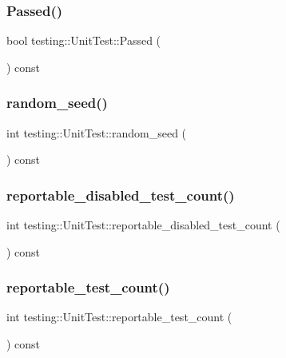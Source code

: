 \subsubsection{\texorpdfstring{Passed()}{Passed()}}
{\footnotesize\ttfamily bool testing\+::\+Unit\+Test\+::\+Passed (\begin{DoxyParamCaption}{ }\end{DoxyParamCaption}) const}

\mbox{\label{classtesting_1_1UnitTest_adddc090a06f2d3a0e68f3762ee262688}} 
\subsubsection{\texorpdfstring{random\_seed()}{random\_seed()}}
{\footnotesize\ttfamily int testing\+::\+Unit\+Test\+::random\+\_\+seed (\begin{DoxyParamCaption}{ }\end{DoxyParamCaption}) const}

\mbox{\label{classtesting_1_1UnitTest_a2a2835db178d5c8569507db9f0a3d54f}} 
\subsubsection{\texorpdfstring{reportable\_disabled\_test\_count()}{reportable\_disabled\_test\_count()}}
{\footnotesize\ttfamily int testing\+::\+Unit\+Test\+::reportable\+\_\+disabled\+\_\+test\+\_\+count (\begin{DoxyParamCaption}{ }\end{DoxyParamCaption}) const}

\mbox{\label{classtesting_1_1UnitTest_a449d0e0350ef146040cd37679c005248}} 
\subsubsection{\texorpdfstring{reportable\_test\_count()}{reportable\_test\_count()}}
{\footnotesize\ttfamily int testing\+::\+Unit\+Test\+::reportable\+\_\+test\+\_\+count (\begin{DoxyParamCaption}{ }\end{DoxyParamCaption}) const}

